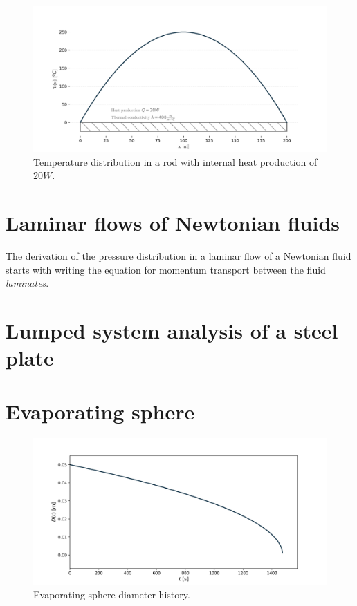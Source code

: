 \documentclass[10pt]{article}
\begin{document}
\begin{figure}[H]
\centering\includegraphics[width=16cm]{Code/conduction-rod.png}
\caption{Temperature distribution in a rod with internal heat production of $20 W$.}
\label{fig:python_graph}
\end{figure}

\newpage

\section{Laminar flows of Newtonian fluids}

The derivation of the pressure distribution in a laminar flow of a Newtonian fluid starts with writing the equation for momentum transport between the fluid \textit{laminates}.




\newpage

\section{Lumped system analysis of a steel plate}



\newpage

\section{Evaporating sphere}

\begin{figure}[H]
\centering\includegraphics[width=16cm]{Code/evaporating-sphere.png}
\caption{Evaporating sphere diameter history.}
\label{fig:stefan-problem}
\end{figure}
\end{document}
